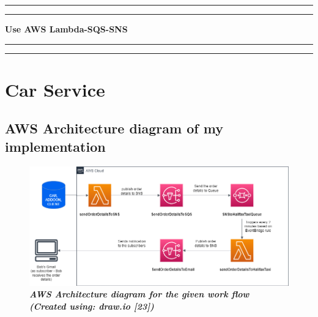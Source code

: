 
\newpage

\begin{flushright}
  \vspace{10cm}
  \rule{18cm}{5pt}
  \rule{18cm}{2pt}\vskip1cm
  \begin{center}
    \begin{bfseries}
      \Huge{\textbf{Use AWS Lambda-SQS-SNS}}\\
    \end{bfseries}
  \end{center}
  \vspace{1cm}
  \rule{18cm}{2pt}
  \rule{18cm}{5pt}
\end{flushright}
\newpage

\chapter{Car Service}
\section{AWS Architecture diagram of my implementation}
    \begin{figure}[htp]
        \centering
        \includegraphics[scale=1, width=15cm]{PROBLEM 3/Screenshots/SDP-A3-Part C - Flowchart.png}
        \caption{\textbf{\textit{AWS Architecture diagram for the given work flow (Created using: draw.io [23])}}}
        \label{fig:aws-arch-diag}
    \end{figure}
